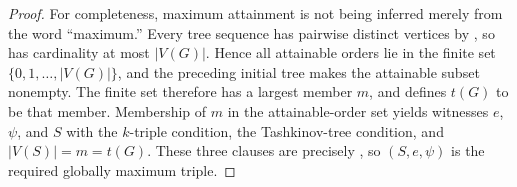\begin{proof}
For completeness, maximum attainment is not being inferred merely from
the word ``maximum.''  Every tree sequence has pairwise distinct vertices
by , so  has
cardinality at most $|V(G)|$.  Hence all attainable orders lie in the
finite set $\{0,1,\ldots,|V(G)|\}$, and the preceding initial tree makes
the attainable subset nonempty.  The finite set therefore has a largest
member $m$, and  defines $t(G)$ to be that member.
Membership of $m$ in the attainable-order set yields witnesses
$e$, $\psi$, and $S$ with the $k$-triple condition, the Tashkinov-tree
condition, and $|V(S)|=m=t(G)$.  These three clauses are precisely
, so $(S,e,\psi)$ is the required globally
maximum triple.
\end{proof}
